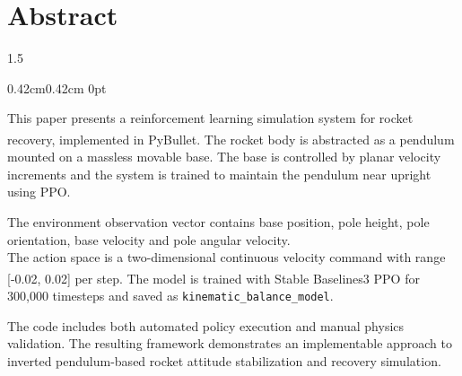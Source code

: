 \documentclass[zihao=-4]{ctexart}
\newcommand{\upcite}[1]{\textsuperscript{\cite{#1}}}
\newcommand{\xiaowu}{\fontsize{9pt}{0}}
\newcommand{\setParDis}{\setlength {\parskip} {0pt} }
\begin{document}
\section*{\textbf{Abstract}} %
\begin{spacing}{1.5}
\begin{adjustwidth}{0.42cm}{0.42cm}
  \setParDis %

  This paper presents a reinforcement learning simulation system for rocket recovery, implemented in PyBullet\upcite{Coumans2016PyBullet}. The rocket body is abstracted as a pendulum mounted on a massless movable base. The base is controlled by planar velocity increments and the system is trained to maintain the pendulum near upright using PPO.

  The environment observation vector contains base position, pole height, pole orientation, base velocity and pole angular velocity. \\ The action space is a two-dimensional continuous velocity command with range [-0.02, 0.02] per step. The model is trained with Stable Baselines3\upcite{Raffin2021SB3} PPO for 300,000 timesteps and saved as \texttt{kinematic\_balance\_model}.

  The code includes both automated policy execution and manual physics validation. The resulting framework demonstrates an implementable approach to inverted pendulum-based rocket attitude stabilization and recovery simulation.
\end{adjustwidth}
\end{spacing}





\clearpage
\tableofcontents
\clearpage

\renewcommand{\headrulewidth}{0.4pt} %

\chead{\xiaowu 北京航空航天大学\Fengru 参赛作品} %

\setcounter{page}{1} 
\end{document}
